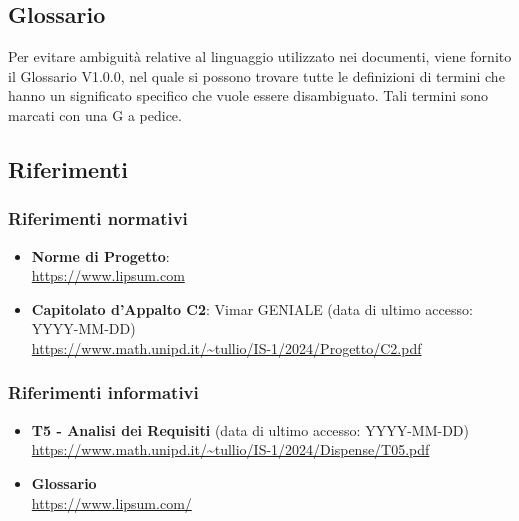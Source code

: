 \subsection{Glossario}
Per evitare ambiguità relative al linguaggio utilizzato nei documenti, viene fornito il Glossario V1.0.0, nel quale si possono trovare tutte le definizioni di termini che hanno un significato specifico che vuole essere disambiguato. Tali termini sono marcati con una G a pedice.
\subsection{Riferimenti}
\subsubsection{Riferimenti  normativi}  
\begin{itemize}
    \item \textbf{Norme di Progetto}:\\
    \url{https://www.lipsum.com} 

    \item \textbf{Capitolato d'Appalto C2}: Vimar GENIALE (data di ultimo accesso: YYYY-MM-DD)\\
    \url{https://www.math.unipd.it/~tullio/IS-1/2024/Progetto/C2.pdf}
\end{itemize}
\subsubsection{Riferimenti informativi}
\begin{itemize}
    \item \textbf{T5 - Analisi dei Requisiti} (data di ultimo accesso: YYYY-MM-DD)\\
    \url{https://www.math.unipd.it/~tullio/IS-1/2024/Dispense/T05.pdf}
    
    \item \textbf{Glossario} \\
    \url{https://www.lipsum.com/}
\end{itemize}
